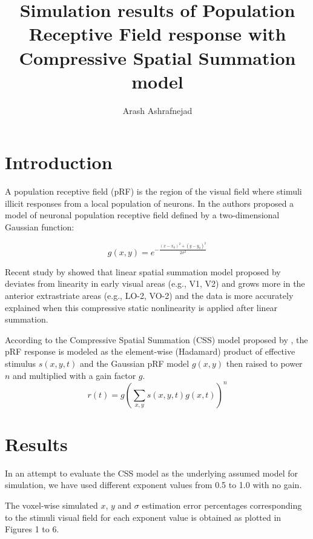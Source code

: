 \documentclass[]{article}
\title{Simulation results of Population Receptive Field response with \\ Compressive Spatial Summation model}
\author{Arash Ashrafnejad}
\begin{document}
\null  %
\nointerlineskip  %
\vfill
\let\snewpage \newpage
\let\newpage \relax
\maketitle
\let \newpage \snewpage
\vfill 
\break %


\section{Introduction}

A population receptive field (pRF) is the region of the visual field where stimuli illicit responses from a local population of neurons. In \cite{Dumoulin2008} the authors proposed a model of neuronal population receptive field defined by a two-dimensional Gaussian function:

\begin{equation}
	g(x, y) = e^{-\frac{(x-x_0)^2+(y-y_0)^2}{2\sigma^2}}
\end{equation}

Recent study by \cite{Kay2013} showed that linear spatial summation model proposed by  deviates from linearity in early visual areas (e.g., V1, V2) and grows more in the anterior extrastriate areas (e.g., LO-2, VO-2) and the data is more accurately explained when this compressive static nonlinearity is applied after linear summation.

According to the Compressive Spatial Summation (CSS) model proposed by , the pRF response is modeled as the element-wise (Hadamard) product of effective stimulus $s(x, y, t)$ and the Gaussian pRF model $g(x, y)$ then raised to power $n$ and multiplied with a gain factor $g$.
\begin{equation}
	r(t) = g (\sum_{x, y} s(x, y, t) g(x, t))^n
\end{equation}

\section{Results}
In an attempt to evaluate the CSS model as the underlying assumed model for simulation, we have used different exponent values from 0.5 to 1.0 with no gain.

The voxel-wise simulated $x$, $y$ and $\sigma$ estimation error percentages corresponding to the stimuli visual field for each exponent value is obtained as plotted in Figures 1 to 6.
\end{document}
